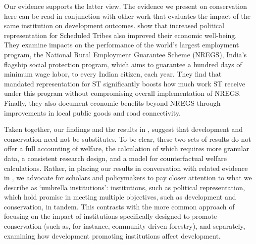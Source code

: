 \documentclass[12pt,reqno]{article}
\begin{document}
Our evidence supports the latter view. The evidence we present on conservation here can be read in conjunction with other work that evaluates the impact of the same institution on development outcomes. \textcite{gulzar2019} show that increased political representation for Scheduled Tribes also improved their economic well-being. They examine impacts on the performance of the world's largest employment program, the National Rural Employment Guarantee Scheme (NREGS), India's flagship social protection program, which aims to guarantee a hundred days of minimum wage labor, to every Indian citizen, each year. 
They find that mandated representation for ST significantly boosts how much work ST receive under this program without compromising overall implementation of NREGS. Finally, they also document economic benefits beyond NREGS through improvements in local public goods and road connectivity.

Taken together, our findings and the results in \textcite{gulzar2019}, suggest that development and conservation need not be substitutes. To be clear, these two sets of results do not offer a full accounting of welfare, the calculation of which requires more granular data, a consistent research design, and a model for counterfactual welfare calculations. Rather, in placing our results in conversation with related evidence in \textcite{gulzar2019}, we advocate for scholars and policymakers to pay closer attention to what we describe as `umbrella institutions': institutions, such as political representation, which hold promise in meeting multiple objectives, such as development and conservation, in tandem. This contrasts with the more common approach of focusing on the impact of institutions specifically designed to promote conservation (such as, for instance, community driven forestry), and separately, examining how development promoting institutions affect development.






\end{document}
